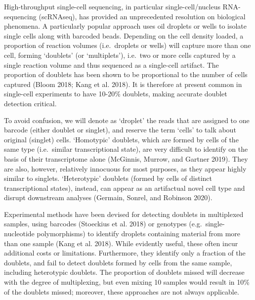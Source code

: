 \documentclass[10pt,a4paper,twocolumn]{article}
\begin{document}
High-throughput single-cell sequencing, in particular single-cell/nucleus RNA-sequencing (scRNAseq), has provided an unprecedented resolution on biological phenomena.
A particularly popular approach uses oil droplets or wells to isolate single cells along with barcoded beads.
Depending on the cell density loaded, a proportion of reaction volumes (i.e.~droplets or wells) will capture more than one cell, forming `doublets' (or `multiplets'), i.e.~two or more cells captured by a single reaction volume and thus sequenced as a single-cell artifact.
The proportion of doublets has been shown to be proportional to the number of cells captured (Bloom 2018; Kang et al. 2018).
It is therefore at present common in single-cell experiments to have 10-20\% doublets, making accurate doublet detection critical.

To avoid confusion, we will denote as `droplet' the reads that are assigned to one barcode (either doublet or singlet), and reserve the term `cells' to talk about original (singlet) cells. `Homotypic' doublets, which are formed by cells of the same type (i.e.~similar transcriptional state), are very difficult to identify on the basis of their transcriptome alone (McGinnis, Murrow, and Gartner 2019). They are also, however, relatively innocuous for most purposes, as they appear highly similar to singlets.
`Heterotypic' doublets (formed by cells of distinct transcriptional states), instead, can appear as an artifactual novel cell type and disrupt downstream analyses (Germain, Sonrel, and Robinson 2020).

Experimental methods have been devised for detecting doublets in multiplexed samples, using barcodes (Stoeckius et al. 2018) or genotypes (e.g.~single-nucleotide polymorphisms) to identify droplets containing material from more than one sample (Kang et al. 2018).
While evidently useful, these often incur additional costs or limitations.
Furthermore, they identify only a fraction of the doublets, and fail to detect doublets formed by cells from the same sample, including heterotypic doublets.
The proportion of doublets missed will decrease with the degree of multiplexing, but even mixing 10 samples would result in 10\% of the doublets missed; moreover, these approaches are not always applicable.
\end{document}
